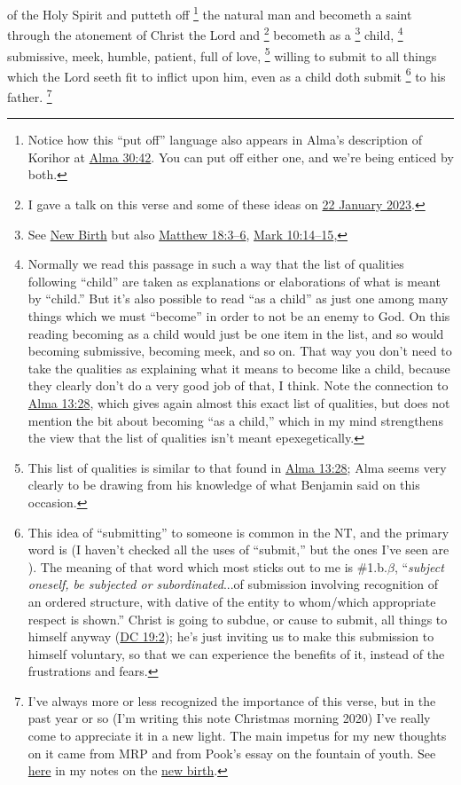 			of the Holy Spirit
			and putteth off%
				\footnote{%
					Notice how this ``put off'' language also appears in Alma's description of Korihor at \hyperref[ALMA-30-42]{Alma 30:42}. You can put off either one, and we're being enticed by both.
					}
			the natural man
			and becometh a saint through the atonement of Christ the Lord
			and
				\footnote{%
					I gave a talk on this verse and some of these ideas on \hyperref[TALKS-22-01-2023]{22 January 2023}.
					}%
			becometh as a
				\footnote{%
					See \hyperref[NEWBIRTH]{New Birth} but also \hyperref[MATTHEW-18-3]{Matthew 18:3--6}, \hyperref[MARK-10-14]{Mark 10:14--15},
					}%
			child,%
				\footnote{%
					Normally we read this passage in such a way that the list of qualities following ``child'' are taken as explanations or elaborations of what is meant by ``child.'' But it's also possible to read ``as a child'' as just one among many things which we must ``become'' in order to not be an enemy to God. On this reading becoming as a child would just be one item in the list, and so would becoming submissive, becoming meek, and so on. That way you don't need to take the qualities as explaining what it means to become like a child, because they clearly don't do a very good job of that, I think. Note the connection to \hyperref[ALMA-13-28]{Alma 13:28}, which gives again almost this exact list of qualities, but does not mention the bit about becoming ``as a child,'' which in my mind strengthens the view that the list of qualities isn't meant epexegetically.
					}
			submissive, meek, humble, patient, full of love,%
				\footnote{%
					This list of qualities is similar to that found in \hyperref[ALMA-13-28]{Alma 13:28}; Alma seems very clearly to be drawing from his knowledge of what Benjamin said on this occasion.
					}
			willing to submit to all things which the Lord seeth fit to inflict upon him,
			even as a child doth submit%
				\footnote{%
					This idea of ``submitting'' to someone is common in the NT, and the primary word is \hyperref[HUPOTASSO]{} (I haven't checked all the uses of ``submit,'' but the ones I've seen are ). The meaning of that word which most sticks out to me is \#1.b.$\beta$, ``\textit{subject oneself, be subjected or subordinated}...of submission involving recognition of an ordered structure, with dative of the entity to whom/which appropriate respect is shown.'' Christ is going to subdue, or cause to submit, all things to himself anyway (\hyperref[DC19-2]{DC 19:2}); he's just inviting us to make this submission to himself voluntary, so that we can experience the benefits of it, instead of the frustrations and fears.
					}
			to his father.%
				\footnote{%
					I've always more or less recognized the importance of this verse, but in the past year or so (I'm writing this note Christmas morning 2020) I've really come to appreciate it in a new light. The main impetus for my new thoughts on it came from MRP and from Pook's essay on the fountain of youth. See \hyperref[NEWBIRTH-child]{here} in my notes on the \hyperref[NEWBIRTH]{new birth}.
					}
					
